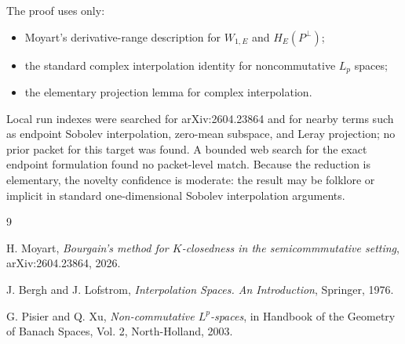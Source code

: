 \documentclass[11pt]{article}
\begin{document}
The proof uses only:
\begin{itemize}
  \item Moyart's derivative-range description for $W_{1,E}$ and $H_E(P^\bot)$;
  \item the standard complex interpolation identity for noncommutative
  $L_p$ spaces;
  \item the elementary projection lemma for complex interpolation.
\end{itemize}

Local run indexes were searched for arXiv:2604.23864 and for nearby terms such
as endpoint Sobolev interpolation, zero-mean subspace, and Leray projection; no
prior packet for this target was found. A bounded web search for the exact
endpoint formulation found no packet-level match. Because the reduction is
elementary, the novelty confidence is moderate: the result may be folklore or
implicit in standard one-dimensional Sobolev interpolation arguments.

\begin{thebibliography}{9}

H. Moyart,
\emph{Bourgain's method for $K$-closedness in the semicommmutative setting},
arXiv:2604.23864, 2026.

J. Bergh and J. Lofstrom,
\emph{Interpolation Spaces. An Introduction},
Springer, 1976.

G. Pisier and Q. Xu,
\emph{Non-commutative $L^p$-spaces},
in Handbook of the Geometry of Banach Spaces, Vol. 2, North-Holland, 2003.

\end{thebibliography}
\end{document}
